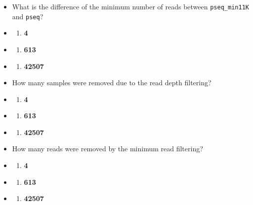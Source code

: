 \documentclass[
]{book}
\providecommand{\tightlist}{%
  \setlength{\itemsep}{0pt}\setlength{\parskip}{0pt}}
\begin{document}
\begin{itemize}
\item
  What is the difference of the minimum number of reads between \texttt{pseq\_min11K} and \texttt{pseq}?
\item
  \begin{enumerate}
  \def\labelenumi{(\Alph{enumi})}
  \tightlist
  \item
    \textbf{4}\\
  \end{enumerate}
\item
  \begin{enumerate}
  \def\labelenumi{(\Alph{enumi})}
  \setcounter{enumi}{1}
  \tightlist
  \item
    \textbf{613}\\
  \end{enumerate}
\item
  \begin{enumerate}
  \def\labelenumi{(\Alph{enumi})}
  \setcounter{enumi}{2}
  \tightlist
  \item
    \textbf{42507}
  \end{enumerate}
\item
  How many samples were removed due to the read depth filtering?
\item
  \begin{enumerate}
  \def\labelenumi{(\Alph{enumi})}
  \tightlist
  \item
    \textbf{4}\\
  \end{enumerate}
\item
  \begin{enumerate}
  \def\labelenumi{(\Alph{enumi})}
  \setcounter{enumi}{1}
  \tightlist
  \item
    \textbf{613}\\
  \end{enumerate}
\item
  \begin{enumerate}
  \def\labelenumi{(\Alph{enumi})}
  \setcounter{enumi}{2}
  \tightlist
  \item
    \textbf{42507}
  \end{enumerate}
\item
  How many reads were removed by the minimum read filtering?
\item
  \begin{enumerate}
  \def\labelenumi{(\Alph{enumi})}
  \tightlist
  \item
    \textbf{4}\\
  \end{enumerate}
\item
  \begin{enumerate}
  \def\labelenumi{(\Alph{enumi})}
  \setcounter{enumi}{1}
  \tightlist
  \item
    \textbf{613}\\
  \end{enumerate}
\item
  \begin{enumerate}
  \def\labelenumi{(\Alph{enumi})}
  \setcounter{enumi}{2}
  \tightlist
  \item
    \textbf{42507}
  \end{enumerate}
\end{itemize}
\end{document}
